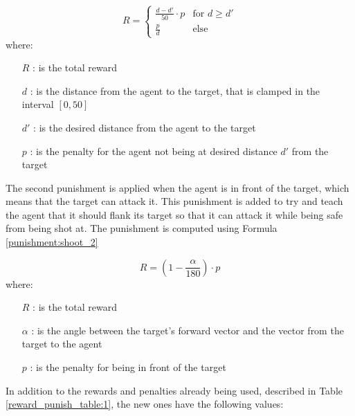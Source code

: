 \begin{equation} \label{punishment:shoot_1}
    R = \begin{cases}
        \frac{d - d'}{50} \cdot p & \text{for } d \geq d' \\
        \frac{p}{d} & \text{else}
    \end{cases}
\end{equation}
where:
\begin{itemize}
    \item [$R$]: is the total reward
    \item [$d$]: is the distance from the agent to the target, that is clamped in the interval $[0, 50]$
    \item [$d'$]: is the desired distance from the agent to the target
    \item [$p$]: is the penalty for the agent not being at desired distance $d'$ from the target
\end{itemize}

The second punishment is applied when the agent is in front of the target, which means that the target can attack it. This punishment is added to try and teach the agent that it should flank its target so that it can attack it while being safe from being shot at. The punishment is computed using Formula \ref{punishment:shoot_2}

\begin{equation} \label{punishment:shoot_2}
    R = (1 - \frac{\alpha}{180}) \cdot p
\end{equation}
where:
\begin{itemize}
    \item [$R$]: is the total reward
    \item [$\alpha$]: is the angle between the target's forward vector and the vector from the target to the agent
    \item [$p$]: is the penalty for being in front of the target
\end{itemize}

In addition to the rewards and penalties already being used, described in Table \ref{reward_punish_table:1}, the new ones have the following values:

